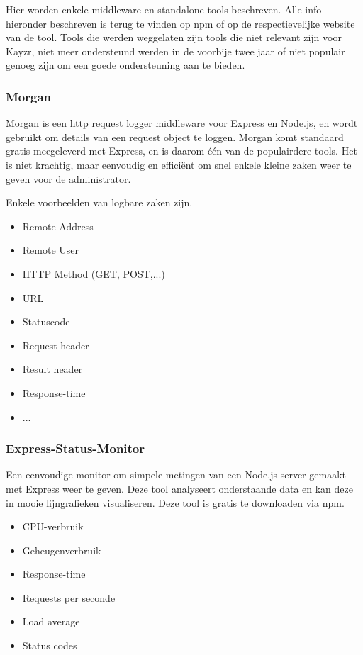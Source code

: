 Hier worden enkele middleware en standalone tools beschreven. Alle info hieronder beschreven is terug te vinden op npm of op de respectievelijke website van de tool. Tools die werden weggelaten zijn tools die niet relevant zijn voor Kayzr, niet meer ondersteund werden in de voorbije twee jaar of niet populair genoeg zijn om een goede ondersteuning aan te bieden. 

\subsubsection{Morgan}
\label{sec:morgan}

Morgan is een http request logger middleware voor Express en Node.js, en wordt gebruikt om details van een request object te loggen. Morgan komt standaard gratis meegeleverd met Express, en is daarom één van de populairdere tools. Het is niet krachtig, maar eenvoudig en efficiënt om snel enkele kleine zaken weer te geven voor de administrator.

Enkele voorbeelden van logbare zaken zijn.

\begin{itemize}
	\item Remote Address
	\item Remote User
	\item HTTP Method (GET, POST,...)
	\item URL
	\item Statuscode
	\item Request header
	\item Result header
	\item Response-time
	\item ...
\end{itemize}

\subsubsection{Express-Status-Monitor}
\label{sec:statusMonitor}

Een eenvoudige monitor om simpele metingen van een Node.js server gemaakt met Express weer te geven. Deze tool analyseert onderstaande data en kan deze in mooie lijngrafieken visualiseren. Deze tool is gratis te downloaden via npm.

\begin{itemize}
	\item CPU-verbruik
	\item Geheugenverbruik
	\item Response-time
	\item Requests per seconde
	\item Load average
	\item Status codes
\end{itemize}

